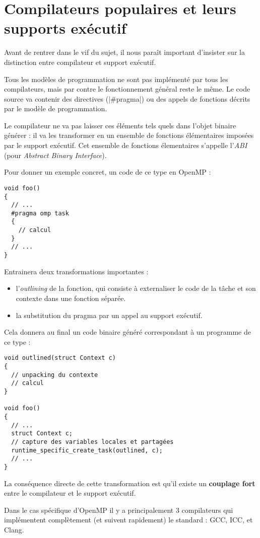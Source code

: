 \section{Compilateurs populaires et leurs supports exécutif}\label{sec:rw:runtimes}


Avant de rentrer dans le vif du sujet, il nous paraît important d'insister sur la distinction entre compilateur et support exécutif.

Tous les modèles de programmation ne sont pas implémenté par tous les compilateurs, mais par contre le fonctionnement général reste le même.
Le code source va contenir des directives (|#pragma|) ou des appels de fonctions décrits par le modèle de programmation.

Le compilateur ne va pas laisser ces éléments tels quels dans l'objet binaire générer : il va les transformer en un ensemble de fonctions élémentaires imposées par le support exécutif. Cet ensemble de fonctions élementaires s'appelle l'\emph{ABI} (pour \emph{Abstract Binary Interface}).

Pour donner un exemple concret, un code de ce type en OpenMP :
\begin{lstlisting}
void foo()
{
  // ...
  #pragma omp task
  {
    // calcul
  }
  // ...
}
\end{lstlisting}

Entrainera deux transformations importantes :
\begin{itemize}
  \item l'\emph{outlining} de la fonction, qui consiste à externaliser le code de la tâche et son contexte dans une fonction séparée.
  \item la substitution du pragma par un appel au support exécutif.
\end{itemize}

Cela donnera au final un code binaire généré correspondant à un programme de ce type :

\begin{lstlisting}
void outlined(struct Context c)
{
  // unpacking du contexte
  // calcul
}

void foo()
{
  // ...
  struct Context c;
  // capture des variables locales et partagées
  runtime_specific_create_task(outlined, c);
  // ...
}
\end{lstlisting}

La conséquence directe de cette transformation est qu'il existe un \textbf{couplage fort} entre le compilateur et le support exécutif.

Dans le cas spécifique d'OpenMP il y a principalement 3 compilateurs qui implémentent complètement (et suivent rapidement) le standard : GCC, ICC, et Clang.


